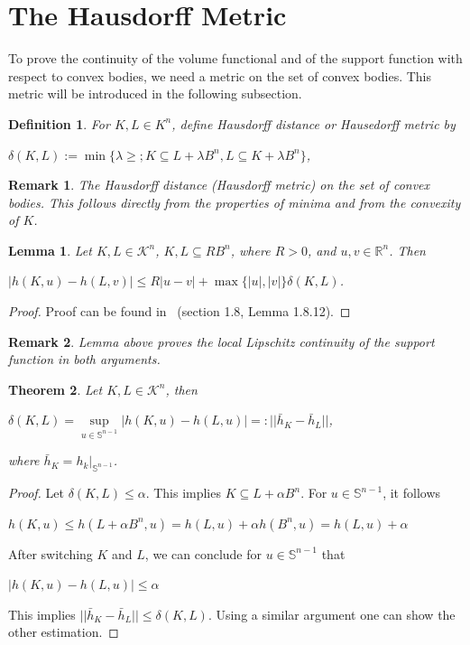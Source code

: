 \documentclass[a4paper]{book}
\newtheorem{theorem}{Theorem}%
\newtheorem{lemma}[theorem]{Lemma}%
\newtheorem{remark}{Remark}%
\newtheorem{definition}{Definition}%
\begin{document}
\section{The Hausdorff Metric}
To prove the continuity of the volume functional and of the support function with respect to convex bodies, we need a metric on the set of convex bodies. This metric will be introduced in the following subsection.

\begin{definition}
    For $K,L\in K^{n}$, define Hausdorff distance or Hausedorff metric by
    \begin{center}
        $\delta(K,L):=\min\{\lambda\geq;K\subseteq L+\lambda B^{n},L\subseteq K+\lambda B^{n}\}$,
    \end{center}
\end{definition}

\begin{remark}
    The Hausdorff distance (Hausdorff metric) on the set of convex bodies. This follows directly from the properties of minima and from the convexity of $K$.
\end{remark}

\begin{lemma}
    Let $K,L\in\mathscr{K}^{n}$, $K,L\subseteq RB^{n}$, where $R>0$, and $u,v\in\mathbb{R}^{n}$. Then
    \begin{center}
        $|h(K,u)-h(L,v)|\leq R|u-v|+\max\{|u|,|v|\}\delta(K,L)$.
    \end{center}
\end{lemma}
\begin{proof}
    Proof can be found in~\cite{schneider2014convex} (section 1.8, Lemma 1.8.12).
\end{proof}

\begin{remark}
    Lemma above proves the local Lipschitz continuity of the support function in both arguments.
\end{remark}

\begin{theorem}
    Let $K,L\in\mathscr{K}^{n}$, then
    \begin{center}
        $\delta(K,L)=\underset{u\in\mathbb{S}^{n-1}}{\sup}|h(K,u)-h(L,u)|=:||\bar{h}_{K}-\bar{h}_{L}||$,
    \end{center}
    where $\displaystyle \bar{h}_{K}=h_{k}|_{\mathbb{S}^{n-1}}$.
\end{theorem}
\begin{proof}
    Let $\delta(K,L)\leq\alpha$. This implies $K\subseteq L+\alpha B^{n}$. For $u\in\mathbb{S}^{n-1}$, it follows 
    \begin{center}
        $h(K,u)\leq h(L+\alpha B^{n},u)=h(L,u)+\alpha h(B^{n},u)=h(L,u)+\alpha$
    \end{center}
    After switching $K$ and $L$, we can conclude for $u\in\mathbb{S}^{n-1}$ that
    \begin{center}
        $|h(K,u)-h(L,u)|\leq\alpha$
    \end{center}
    This implies $||\bar{h}_{K}-\bar{h}_{L}||\leq\delta(K,L)$. Using a similar argument one can show the other estimation.
\end{proof}
\end{document}
